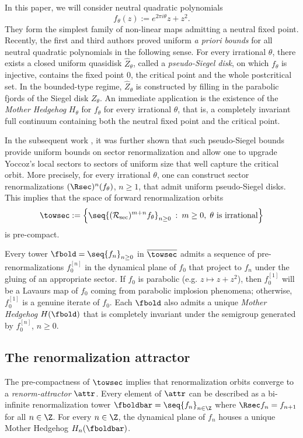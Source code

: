 \documentclass{amsart}
\begin{document}
In this paper, we will consider neutral quadratic polynomials
\[
    f_\theta(z) := e^{2\pi i \theta} z + z^2.
\]
They 
form the simplest family of non-linear maps admitting a neutral fixed point.
Recently, the first and third authors \cite{DLy22} proved uniform \emph{a priori bounds} for all neutral quadratic polynomials in the following sense.
For every irrational $\theta$, there exists a closed uniform quasidisk $\hat{Z}_\theta$, called a \emph{pseudo-Siegel disk}, on which $f_\theta$ is injective, contains the fixed point $0$, the critical point and the whole postcritical set.
In the bounded-type regime, $\hat{Z}_\theta$ is constructed by filling in the parabolic fjords of the Siegel disk $Z_\theta$.
An immediate application is the existence of the \emph{Mother Hedgehog} $H_\theta$ for $f_\theta$ for every irrational $\theta$, that is, a completely invariant full continuum containing both the neutral fixed point and the critical point.

In the subsequent work \cite{DLy26a}, it was further shown that such pseudo-Siegel bounds provide uniform bounds on sector renormalization and allow one to upgrade Yoccoz's local sectors to sectors of uniform size that well capture the critical orbit. 
More precisely, for every irrational $\theta$, one can construct sector renormalizations $(\Rsec)^n (f_{\theta})$, $n \geq 1$, that admit uniform pseudo-Siegel disks. 
This implies that the space of forward renormalization orbits 
\begin{equation}
    \label{eq:intro.renorm.attr}
\towsec := \left\{ \seq{ (\mathcal{R}_{\text{sec}} )^{m+n} f_\theta }_{n \geq 0} \: : \: m \geq 0, \; \theta \text{ is irrational}\right\}
\end{equation}
is pre-compact.

Every tower $\fbold = \seq{f_n}_{n\geq 0}$ in $\overline{\towsec}$ admits a sequence of pre-renormalizations $f_0^{[n]}$ in the dynamical plane of $f_0$ that project to $f_n$ under the gluing of an appropriate sector. 
If $f_0$ is parabolic (e.g. $z\mapsto z+z^2$), then $f_0^{[1]}$ will be a Lavaurs map of $f_0$ coming from parabolic implosion phenomena; otherwise, $f_0^{[1]}$ is a genuine iterate of $f_0$. 
Each $\fbold$ also admits a unique \emph{Mother Hedgehog} $H(\fbold)$ that is completely invariant under the semigroup generated by $f_0^{[n]}$, $n\geq 0$.

\subsection{The renormalization attractor}\label{ss:intro:main:thm}
The pre-compactness of $\towsec$ implies that renormalization orbits converge to a \emph{renorm-attractor} $\attr$.
Every element of $\attr$ can be described as a bi-infinite renormalization tower $\fboldbar = \seq{f_n}_{n\in \Z}$ where $\Rsec f_n = f_{n+1}$ for all $n \in \Z$.
For every $n \in \Z$, the dynamical plane of $f_n$ houses a unique Mother Hedgehog $H_n(\fboldbar)$.
\end{document}
